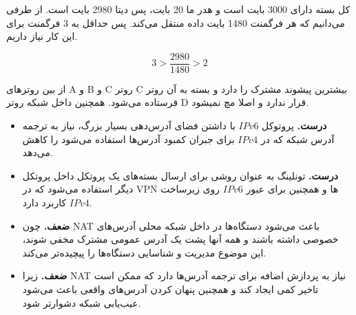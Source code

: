 
کل بسته دارای 3000 بایت است و هدر ما 20 بایت، پس دیتا 2980 بایت است. از طرفی می‌دانیم که هر فرگمنت 1480 بایت داده منتقل می‌کند. پس حداقل به 3 فرگمنت برای این کار نیاز داریم.

\[
3 > \frac{2980}{1480} > 2
\]



از بین روترهای A و B و C روتر C بیشترین پیشوند مشترک را دارد و بسته به آن روتر فرستاده می‌شود. همچنین داخل شبکه روتر D قرار ندارد و اصلا مچ نمیشود.


\begin{itemize}
	\item \textbf{درست.}
	پروتوکل $IPv6$ با داشتن فضای آدرس‌دهی بسیار بزرگ، نیاز به ترجمه آدرس شبکه که در $IPv4$ برای جبران کمبود آدرس‌ها استفاده می‌شود را کاهش می‌دهد.
	\item \textbf{درست.}
	تونلینگ به عنوان روشی برای ارسال بسته‌های یک پروتکل داخل پروتکل دیگر استفاده می‌شود که در VPN ها و همچنین برای عبور $IPv6$ روی زیرساخت $IPv4$ کاربرد دارد.
\end{itemize}





\begin{itemize}
	\item \textbf{ضعف.}
چون NAT باعث می‌شود دستگاه‌ها در داخل شبکه محلی آدرس‌های خصوصی داشته باشند و همه آنها پشت یک آدرس عمومی مشترک مخفی شوند، این موضوع مدیریت و شناسایی دستگاه‌ها را پیچیده‌تر می‌کند.
	\item \textbf{ضعف.}
زیرا NAT نیاز به پردازش اضافه برای ترجمه آدرس‌ها دارد که ممکن است تاخیر کمی ایجاد کند و همچنین پنهان کردن آدرس‌های واقعی باعث می‌شود عیب‌یابی شبکه دشوارتر شود.

\end{itemize}

